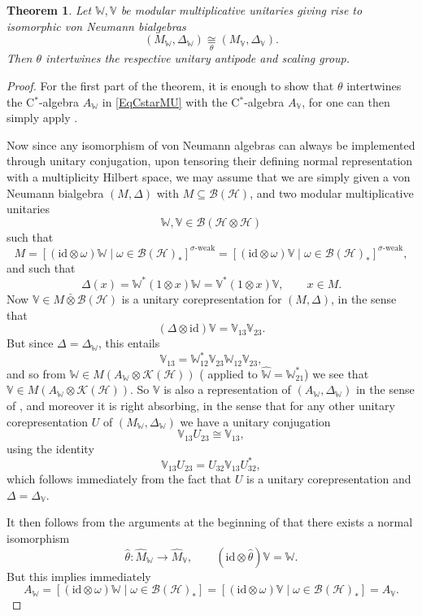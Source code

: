 \documentclass[11pt, reqno]{amsart}
\newtheorem{theorem}{Theorem}[section]
\theoremstyle{definition}
\numberwithin{equation}{section}
\def\Hc{\mathcal H}
\newcommand{\Hsp}{\mathcal{H}}
\newcommand{\Bc}{\mathcal{B}}
\newcommand{\Kc}{\mathcal{K}}
\newcommand{\id}{\mathrm{id}}
\newcommand{\Wbb}{\mathbb{W}}
\newcommand{\Vbb}{\mathbb{V}}
\begin{document}
\begin{theorem} \label{TheoIndepofantipode}
Let $\Wbb,\Vbb$ be modular multiplicative unitaries giving rise to isomorphic von Neumann bialgebras
\begin{equation}\label{EqIsovN}
(M_{\Wbb},\Delta_{\Wbb})\underset{\theta}{\cong} (M_{\Vbb},\Delta_{\Vbb}). 
\end{equation}
Then $\theta$ intertwines the respective unitary antipode and scaling group. 
\end{theorem} 
\begin{proof}
For the first part of the theorem, it is enough to show that $\theta$ intertwines the C$^*$-algebra $A_{\Wbb}$ in \eqref{EqCstarMU} with the C$^*$-algebra $A_{\Vbb}$, for one can then simply apply \cite[Theorem 5]{SW07}.  

Now since any isomorphism of von Neumann algebras can always be implemented through unitary conjugation, upon tensoring their defining normal representation with a multiplicity Hilbert space, we may assume that we are simply given a von Neumann bialgebra $(M,\Delta)$ with $M \subseteq \Bc(\Hsp)$, and two modular multiplicative unitaries 
\[
\Wbb,\Vbb\in \Bc(\Hsp \otimes \Hsp)
\]
such that 
\[
M = [(\id\otimes \omega)\Wbb\mid \omega\in \Bc(\Hc)_*]^{\sigma\textrm{-weak}} = [(\id\otimes \omega)\Vbb\mid \omega\in \Bc(\Hc)_*]^{\sigma\textrm{-weak}},
\]
and such that
\[
\Delta(x) = \Wbb^*(1\otimes x)\Wbb = \Vbb^*(1\otimes x)\Vbb,\qquad x\in M. 
\]
Now $\Vbb \in M \bar{\otimes}\Bc(\Hsp)$ is a unitary corepresentation for $(M,\Delta)$, in the sense that 
\[
(\Delta\otimes \id)\Vbb = \Vbb_{13}\Vbb_{23}. 
\]
But since $\Delta = \Delta_{\Wbb}$, this entails 
\[
\Vbb_{13} = \Wbb_{12}^*\Vbb_{23}\Wbb_{12}\Vbb_{23},
\]
and so from $\Wbb \in M(A_{\Wbb}\otimes \Kc(\Hsp))$ (\cite[Theorem 2.3]{SW01} applied to $\hat{\Wbb} = \Wbb_{21}^*$) we see that $\Vbb \in M(A_{\Wbb}\otimes \Kc(\Hsp))$. So $\Vbb$ is also a representation of $(A_{\Wbb},\Delta_{\Wbb})$ in the sense of \cite{SW07}, and moreover it is right absorbing, in the sense that for any other unitary corepresentation $U$ of $(M_{\Wbb},\Delta_{\Wbb})$ we have a unitary conjugation
\[
\Vbb_{13}U_{23} \cong \Vbb_{13},
\]
using the identity 
\[
\Vbb_{13}U_{23}  =  U_{32}\Vbb_{13}U_{32}^*,
\]
which follows immediately from the fact that $U$ is a unitary corepresentation and $\Delta = \Delta_{\Vbb}$. 

It then follows from the arguments at the beginning of \cite[Section 4]{SW07} that there exists a normal isomorphism 
\[
\hat{\theta}\colon  \hat{M}_{\Wbb} \rightarrow \hat{M}_{\Vbb},\qquad (\id\otimes \hat{\theta})\Vbb = \Wbb. 
\]
But this implies immediately 
\[
A_{\Wbb} = [(\id\otimes \omega)\Wbb\mid \omega \in \Bc(\Hsp)_*] = [(\id\otimes \omega)\Vbb\mid \omega \in \Bc(\Hsp)_*]  = A_{\Vbb}.
\] 
\end{proof}
\end{document}
